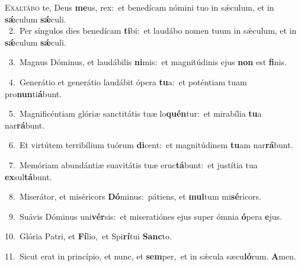 \lettrine{\initial\textcolor{\initialcolor}{E}}{xaltábo} te, Deus \textbf{me}\-us, rex:~\star et benedícam nómini tuo in sǽculum, et in \textbf{sǽ}\-culum \textbf{sǽ}\-culi.\\
{\numbfont\textcolor{\numbcolor}{~2.}}~Per síngulos dies benedícam \textbf{ti}\-bi:~\star et laudábo nomen tuum in sǽculum, et in \textbf{sǽ}\-culum \textbf{sǽ}\-culi.\par
{\numbfont\textcolor{\numbcolor}{~3.}}~Magnus Dóminus, et laudábilis \textbf{ni}\-mis:~\star et magnitúdinis ejus \textbf{non} est \textbf{fi}\-nis.\par
{\numbfont\textcolor{\numbcolor}{~4.}}~Generátio et generátio laudábit ópera \textbf{tu}\-a:~\star et poténtiam tuam pro\-\textbf{nun}\-ti\-\textbf{á}\-bunt.\par
{\numbfont\textcolor{\numbcolor}{~5.}}~Magnificéntiam glóriæ sanctitátis tuæ lo\-\textbf{quén}\-tur:~\star et mirabília \textbf{tu}\-a nar\-\textbf{rá}\-bunt.\par
{\numbfont\textcolor{\numbcolor}{~6.}}~Et virtútem terribílium tuórum \textbf{di}\-cent:~\star et magnitúdinem \textbf{tu}\-am nar\-\textbf{rá}\-bunt.\par
{\numbfont\textcolor{\numbcolor}{~7.}}~Memóriam abundántiæ suavitátis tuæ eruc\-\textbf{tá}\-bunt:~\star et justítia tua \textbf{ex}\-sul\-\textbf{tá}\-bunt.\par
{\numbfont\textcolor{\numbcolor}{~8.}}~Miserátor, et miséricors \textbf{Dó}\-minus:~\star pátiens, et \textbf{mul}\-tum mi\-\textbf{sé}\-ricors.\par
{\numbfont\textcolor{\numbcolor}{~9.}}~Suávis Dóminus uni\-\textbf{vér}\-sis:~\star et miseratiónes ejus super ómnia \textbf{ó}\-pera \textbf{e}\-jus.\par
{\numbfont\textcolor{\numbcolor}{10.}}~Glória Patri, et \textbf{Fí}\-lio,~\star et Spi\-\textbf{rí}\-tui \textbf{Sanc}\-to.\par
{\numbfont\textcolor{\numbcolor}{11.}}~Sicut erat in princípio, et nunc, et \textbf{sem}\-per,~\star et in sǽcula sæcu\-\textbf{ló}\-rum. \textbf{A}\-men.\par
